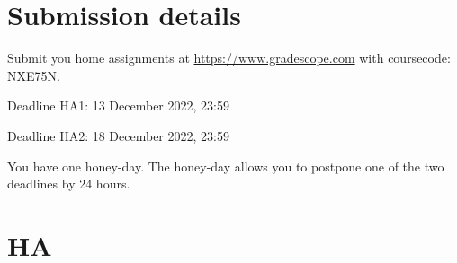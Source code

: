 \documentclass[12pt]{article}
\begin{document}
\section*{Submission details}

Submit you home assignments at \url{https://www.gradescope.com} with coursecode: NXE75N. 

Deadline HA1: 13 December 2022, 23:59

Deadline HA2: 18 December 2022, 23:59

You have one honey-day. The honey-day allows you to postpone one of the two deadlines by 24 hours. 
\newpage



\section{HA}
\end{document}
